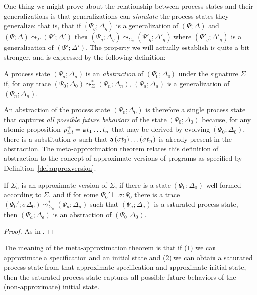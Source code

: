 One thing we might prove about the relationship between process states
and their generalizations is that generalizations can {\it simulate}
the process states they generalize: that is, that if $(\Psi_g;
\Delta_g)$ is a generalization of $(\Psi; \Delta)$ and $(\Psi; \Delta)
\leadsto_\Sigma (\Psi'; \Delta')$ then $(\Psi_g; \Delta_g)
\leadsto_{\Sigma_a} (\Psi'_g; \Delta'_g)$ where $(\Psi'_g; \Delta'_g)$
is a generalization of $(\Psi'; \Delta')$. The property we will
actually establish is quite a bit stronger, and is expressed by the
following definition:

\bigskip
\begin{definition}
A process state $(\Psi_a; \Delta_a)$ is an {\em abstraction} of 
$(\Psi_0; \Delta_0)$ under the signature $\Sigma$ if, for any trace
$(\Psi_0; \Delta_0) \leadsto^*_\Sigma (\Psi_n; \Delta_n)$, 
$(\Psi_a; \Delta_a)$ is a generalization of $(\Psi_n; \Delta_n)$. 
\end{definition}
\bigskip

An abstraction of the process state $(\Psi_0; \Delta_0)$ is therefore
a single process state that captures {\it all possible future
  behaviors} of the state $(\Psi_0; \Delta_0)$ because, for any atomic
proposition $p^+_{\it lvl} = {\sf a}\,t_1\ldots t_n$ that may be derived
by evolving $(\Psi_0; \Delta_0)$, there is a substitution $\sigma$
such that ${\sf a}\,(\sigma t_1)\ldots(\sigma t_n)$ is already present
in the abstraction. The meta-approximation theorem relates this definition
of abstraction to the concept of approximate versions of programs as
specified by Definition~\ref{def:approxversion}.  

\bigskip
\begin{theorem}\label{thm:metapprox}
  If $\Sigma_a$ is an approximate version of $\Sigma$, if there is a
  state $(\Psi_0; \Delta_0)$ well-formed according to $\Sigma$, and if
  for some $\Psi_0' \vdash \sigma : \Psi_0$ there is a trace
  $(\Psi_0'; \sigma\Delta_0) \leadsto^*_{\Sigma_a} (\Psi_a; \Delta_a)$
  such that $(\Psi_a; \Delta_a)$ is a saturated process state, then
  $(\Psi_a; \Delta_a)$ is an abstraction of $(\Psi_0; \Delta_0)$.
\end{theorem}

\begin{proof}
As in \cite[Theorem 3]{simmons11logical}.
\end{proof}

The meaning of the meta-approximation theorem is that if (1) we can
approximate a specification and an initial state and (2) we can obtain
a saturated process state from that approximate specification
and approximate initial state, then the saturated process state captures
all possible future behaviors of the (non-approximate) initial state. 


